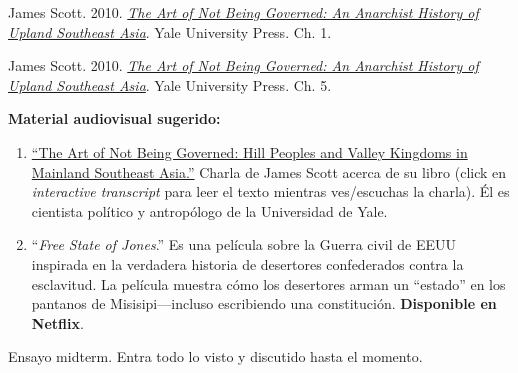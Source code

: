 \documentclass[letterpaper]{article}
\renewenvironment{itemize}{
  \begin{list}{}{
    \setlength{\leftmargin}{1.5em}
  }
}{
  \end{list}
}
\begin{document}
\begin{enumerate}[label=\roman*.]
\begin{itemize}
\begin{itemize}
          \item[$\circ$] James Scott. 2010. \href{https://github.com/hbahamonde/Ciencia_Politica_II/raw/master/Readings/Scott.pdf}{\emph{The Art of Not Being Governed: An Anarchist History of Upland Southeast Asia}}. Yale University Press. Ch. 1.

          
          \item[$\circ$] James Scott. 2010. \href{https://github.com/hbahamonde/Ciencia_Politica_II/raw/master/Readings/Scott.pdf}{\emph{The Art of Not Being Governed: An Anarchist History of Upland Southeast Asia}}. Yale University Press. Ch. 5.
					

                    \item[{\Pointinghand}] {\bf Material audiovisual sugerido:}
                  \begin{enumerate}
                    \item \href{https://www.cornell.edu/video/james-scott-the-art-of-not-being-governed}{``The Art of Not Being Governed: Hill Peoples and Valley Kingdoms in Mainland Southeast Asia.''} Charla de James Scott acerca de su libro (click en \emph{interactive transcript} para leer el texto mientras ves/escuchas la charla). \'El es cientista pol\'itico y antrop\'ologo de la Universidad de Yale. 

                    \item ``\emph{Free State of Jones}.'' Es una pel\'icula sobre la Guerra civil de EEUU inspirada en la verdadera historia de desertores confederados contra la esclavitud. La pel\'icula muestra c\'omo los desertores arman un ``estado'' en los pantanos de Misisipi---incluso escribiendo una constituci\'on. {\bf Disponible en Netflix}.
                  \end{enumerate}

        		\end{itemize}	






		\end{itemize}

\item[{\color{red}\Pointinghand}] Ensayo midterm. Entra todo lo visto y discutido hasta el momento.



\end{enumerate}
\end{document}
